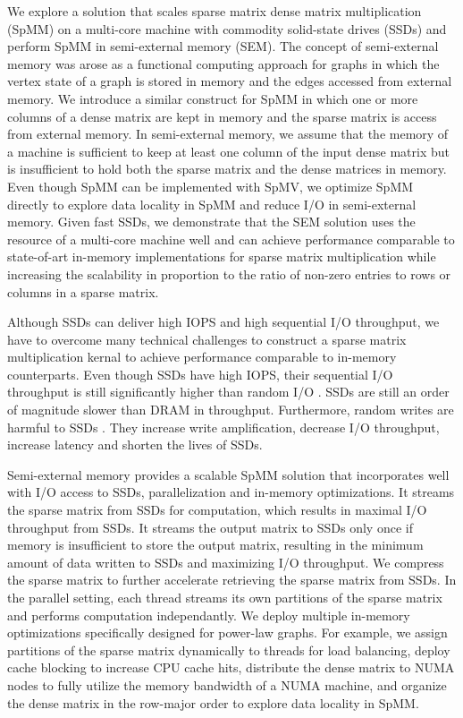We explore a solution that scales sparse matrix dense matrix multiplication
(SpMM) on a multi-core machine with commodity solid-state drives (SSDs) and
perform SpMM in semi-external memory (SEM). The concept of semi-external memory
was arose as a functional computing approach for graphs \cite{Abello98} in which
the vertex state of a graph is stored in memory and the edges accessed from
external memory. We introduce a similar construct for SpMM in which one or more
columns of a dense matrix are kept in memory and the sparse matrix is access
from external memory. In semi-external memory, we assume
that the memory of a machine is sufficient to keep at least one column
of the input dense matrix but is insufficient to hold both the sparse matrix
and the dense matrices in memory. Even though SpMM can be implemented with SpMV,
we optimize SpMM directly to explore data locality in SpMM and reduce I/O
in semi-external memory. Given fast SSDs, we demonstrate that the SEM solution
uses the resource of a multi-core machine well and
can achieve performance comparable to state-of-art in-memory implementations
for sparse matrix multiplication while increasing the scalability in proportion
to the ratio of non-zero entries to rows or columns in a sparse matrix.


Although SSDs can deliver high IOPS and high sequential I/O throughput, we have
to overcome many technical challenges to construct a sparse matrix
multiplication kernal to achieve performance comparable to in-memory
counterparts. Even though SSDs have high IOPS, their sequential I/O throughput is
still significantly higher than random I/O \cite{safs}. SSDs are still an order of
magnitude slower than DRAM in throughput. Furthermore, random writes are harmful
to SSDs \cite{sfs}. They increase write amplification, decrease I/O throughput,
increase latency and shorten the lives of SSDs.

Semi-external memory provides a scalable SpMM solution that incorporates well
with I/O access to SSDs, parallelization and in-memory optimizations.
It streams the sparse matrix from SSDs for computation, which results in maximal
I/O throughput from SSDs. It streams the output matrix to SSDs only once if
memory is insufficient to store the output matrix, resulting in
the minimum amount of data written to SSDs and maximizing I/O throughput.
We compress the sparse matrix to further accelerate retrieving the sparse
matrix from SSDs. In the parallel setting, each thread streams its own partitions
of the sparse matrix and performs computation independantly.
We deploy multiple in-memory optimizations specifically designed for power-law
graphs. For example, we assign partitions of the sparse matrix dynamically to
threads for load balancing, deploy cache blocking to increase CPU cache hits,
distribute the dense matrix to NUMA nodes to fully utilize the memory
bandwidth of a NUMA machine, and organize the dense matrix in the row-major order
to explore data locality in SpMM.

